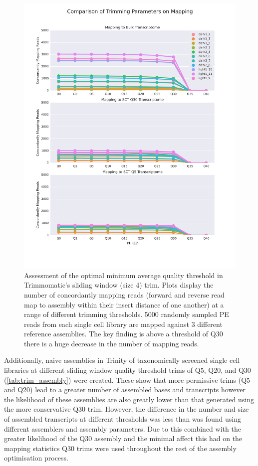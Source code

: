 \begin{figure}
    \includegraphics[width=\textwidth]{trimmingopt.svg}
    \caption{Assessment of the optimal minimum average quality threshold
             in Trimmomatic's sliding window (size 4) trim.  Plots
             display the number of concordantly mapping reads (forward
                 and reverse read map to assembly within their insert
             distance of one another) at a range of different trimming
             thresholds.  5000 randomly sampled PE reads 
             from each single cell library are mapped against 3 different 
             reference assemblies. 
             The key finding is above a threshold of Q30 there is a huge
         decrease in the number of mapping reads.}
         \label{fig:trimmingopt}
\end{figure}

Additionally, naive assemblies in Trinity of taxonomically screened single cell libraries
at different sliding window quality threshold trims of Q5, Q20, and Q30 (\ref{tab:trim_assembly})
were created. 
These show that more permissive trims (Q5 and Q20) lead to a greater number of assembled bases and transcripts 
however the likelihood of these assemblies are also greatly lower than that generated using the 
more conservative Q30 trim. 
However, the difference in the number and size of assembled transcripts at different thresholds 
was less than was found using different assemblers and assembly parameters.
Due to this combined with the greater likelihood of the Q30 assembly and the minimal affect this had on the 
mapping statistics Q30 trims were used throughout the rest of the assembly optimisation process. 

